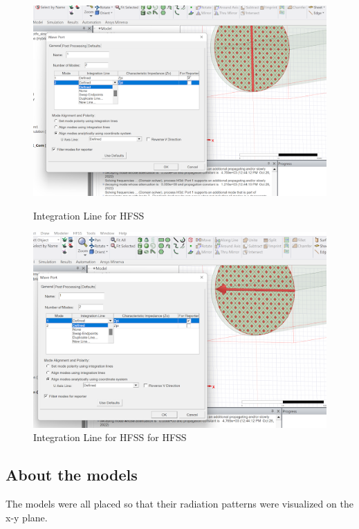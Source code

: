 \documentclass[a4paper,12pt]{report}
\begin{document}
\begin{figure}
  \centering
  \begin{minipage}{0.45\textwidth}
    \centering
    \includegraphics[clip, keepaspectratio, width=0.9\linewidth]{img/hfss_mode_integration_line_1.png}
    \caption{Integration Line for HFSS}
    \label{fig:hfss_mode_integration_line_1}
  \end{minipage}\hfill
  \begin{minipage}{0.45\textwidth}
    \centering
    \includegraphics[clip, keepaspectratio, width=0.9\linewidth]{img/hfss_mode_integration_line_2.png}
    \caption{Integration Line for HFSS for HFSS}
    \label{fig:hfss_mode_integration_line_2}
  \end{minipage}\hfill
\end{figure}

\subsection{About the models}

The models were all placed so that their radiation patterns
were visualized on the x-y plane.
\end{document}
